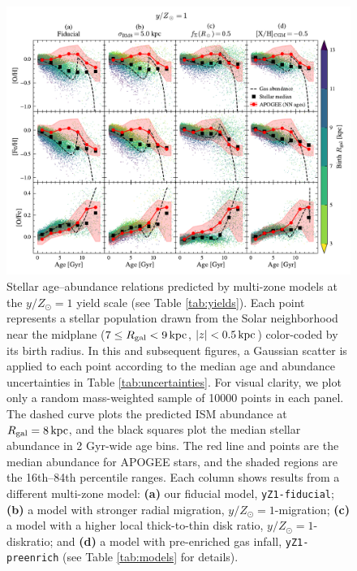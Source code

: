 \documentclass[twocolumn,twocolappendix,linenumbers]{aastex631}
\newcommand{\yZ}[1]{$y/Z_\odot=#1$}
\newcommand{\kpc}{\,{\rm kpc}}
\begin{document}
\begin{figure}
    \centering
    \includegraphics[width=\linewidth]{figures/stellar_abundance_evolution.pdf}
    \caption{Stellar age--abundance relations predicted by multi-zone models at the \yZ{1} yield scale (see Table \ref{tab:yields}). Each point represents a stellar population drawn from the Solar neighborhood near the midplane ($7\leq R_{\rm gal}< 9\kpc$, $|z| < 0.5\kpc$) color-coded by its birth radius. In this and subsequent figures, a Gaussian scatter is applied to each point according to the median age and abundance uncertainties in Table \ref{tab:uncertainties}. For visual clarity, we plot only a random mass-weighted sample of \num{10000} points in each panel. The dashed curve plots the predicted ISM abundance at $R_{\rm gal}=8\kpc$, and the black squares plot the median stellar abundance in {2 Gyr}-wide age bins. The red line and points are the median abundance for APOGEE stars, and the shaded regions are the 16th--84th percentile ranges. 
    Each column shows results from a different multi-zone model: {\bf (a)} our fiducial model, {\tt yZ1-fiducial}; {\bf (b)} a model with stronger radial migration, {\yZ1-migration}; {\bf (c)} a model with a higher local thick-to-thin disk ratio, {\yZ1-diskratio}; and {\bf (d)} a model with pre-enriched gas infall, {\tt yZ1-preenrich} (see Table \ref{tab:models} for details). 
    }
    \label{fig:abundance-evolution-params}
\end{figure}
\end{document}

